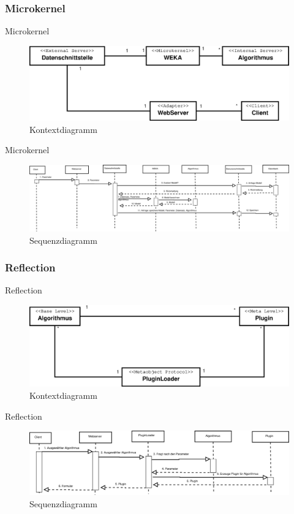 \documentclass{beamer}
\begin{document}
		\subsubsection{Microkernel}
		\begin{frame}{Microkernel}
			\begin{figure}
				\centering
				\includegraphics[width=0.7\linewidth]{Grafik/Diagramm/Microkernel}
				\caption{Kontextdiagramm}
				\label{fig:Kontext2}
			\end{figure}
		\end{frame}
		\begin{frame}{Microkernel}
			\begin{figure}[h]	
				\includegraphics[width=1\linewidth]{Grafik/Diagramm/Szenarios/Berechnung3}
				\caption{Sequenzdiagramm}
				\label{fig:Sequenz2}
			\end{figure}
		\end{frame}
		
		\subsubsection{Reflection}
		\begin{frame}{Reflection}
			\begin{figure}
				\centering
				\includegraphics[width=0.7\linewidth]{Grafik/Diagramm/Reflection}
				\caption{Kontextdiagramm}
				\label{fig:Kontext3}
			\end{figure}
		\end{frame}
		\begin{frame}{Reflection}	
			\begin{figure}
				\includegraphics[width=1\linewidth]{Grafik/Diagramm/Szenarios/Berechnung2}
				\caption{Sequenzdiagramm}
				\label{fig:Sequenz3}
			\end{figure}
		\end{frame}
		
\end{document}
